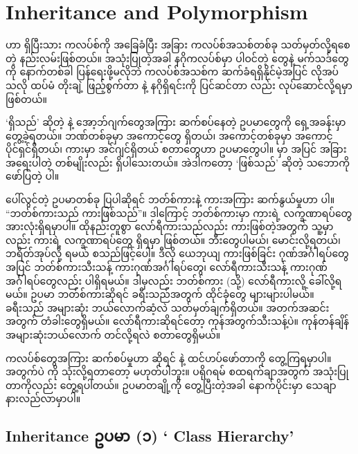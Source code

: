 \chapter{Inheritance and Polymorphism}

 ဟာ ရှိပြီးသား ကလပ်စ်ကို အခြေခံပြီး အခြား ကလပ်စ်အသစ်တစ်ခု သတ်မှတ်လို့ရစေတဲ့ နည်းလမ်းဖြစ်တယ်။  အသုံးပြုတဲ့အခါ နဂိုကလပ်စ်မှာ ပါဝင်တဲ့  တွေနဲ့ မက်သဒ်တွေကို နောက်တစ်ခါ ပြန်ရေးဖို့မလိုဘဲ ကလပ်စ်အသစ်က ဆက်ခံရရှိနိုင်မဲ့အပြင် လိုအပ်သလို ထပ်မံ တိုးချဲ့ ဖြည့်စွက်တာ  နဲ့ နဂိုရှိရင်းကို ပြင်ဆင်တာ  လည်း  လုပ်ဆောင်လို့ရမှာဖြစ်တယ်။

 ‘ရှိသည်’ ဆိုတဲ့  နဲ့ အော့ဘ်ဂျက်တွေအကြား ဆက်စပ်နေတဲ့ ဥပမာတွေကို ရှေ့အခန်းမှာ တွေ့ခဲ့ရတယ်။ ဘဏ်တစ်ခုမှာ အကောင့်တွေ ရှိတယ်၊ အကောင့်တစ်ခုမှာ အကောင့်ပိုင်ရှင်ရှိတယ်၊ ကားမှာ အင်ဂျင်ရှိတယ် စတာတွေဟာ  ဥပမာတွေပါ။  မှာ  အပြင် အခြားအရေးပါတဲ့  တစ်မျိုးလည်း ရှိပါသေးတယ်။ အဲဒါကတော့  ‘ဖြစ်သည်’ ဆိုတဲ့ သဘောကိုဖော်ပြတဲ့   ပါ။ 

ပေါ်လွင်တဲ့ ဥပမာတစ်ခု ပြပါဆိုရင် ဘတ်စ်ကားနဲ့ ကားအကြား ဆက်နွယ်မှုဟာ  ပါ။ “ဘတ်စ်\allowbreak ကားသည် ကားဖြစ်သည်”။ ဒါကြောင့် ဘတ်စ်ကားမှာ ကားရဲ့ လက္ခဏာရပ်တွေ အားလုံးရှိရမှာပါ။ ထိုနည်းတူစွာ လော်ရီကားသည်လည်း  ကားဖြစ်တဲ့အတွက် သူ့မှာလည်း ကားရဲ့ လက္ခဏာရပ်တွေ ရှိရမှာ ဖြစ်တယ်။ ဘီးတွေပါမယ်၊ မောင်းလို့ရတယ်၊ ဘရိတ်အုပ်လို့ ရမယ် စသည်ဖြင့်ပေါ့။ ဒီလို ယေဘုယျ ကားဖြစ်ခြင်း ဂုဏ်အင်္ဂါရပ်တွေအပြင် ဘတ်စ်ကားသီးသန့် ကားဂုဏ်အင်္ဂါရပ်တွေ၊ လော်ရီကားသီးသန့် ကားဂုဏ်အင်္ဂါရပ်တွေလည်း ပါရှိရမယ်။ ဒါမှလည်း ဘတ်စ်ကား (သို့) လော်ရီကားလို့ ခေါ်လို့ရမယ်။ ဥပမာ ဘတ်စ်ကားဆိုရင် ခရီးသည်အတွက် ထိုင်ခုံတွေ များများပါမယ်။  ခရီးသည် အများဆုံး ဘယ်လောက်ဆံ့လဲ သတ်မှတ်ချက်ရှိတယ်။ အတက်အဆင်းအတွက် တံခါးတွေရှိမယ်။ လော်ရီကားဆိုရင်တော့ ကုန်အတွက်သီးသန့်ပဲ။ ကုန်တန်ချိန် အများဆုံးဘယ်လောက် တင်လို့ရလဲ စတာတွေရှိမယ်။ 

ကလပ်စ်တွေအကြား ဆက်စပ်မှုဟာ  ဆိုရင်   နဲ့  ထင်ဟပ်ဖော်တာကို တွေ့ကြရမှာပါ။   အတွက်ပဲ  ကို သုံးလို့ရတာတော့ မဟုတ်ပါဘူး။ ပရိုဂရမ် စထရက်ချာအတွက် အသုံးပြုတာကိုလည်း တွေ့ရပါတယ်။  ဥပမာတချို့ကို တွေ့ပြီးတဲ့အခါ နောက်ပိုင်းမှာ သေချာ နားလည်လာမှာပါ။ 

\section{Inheritance ဥပမာ (၁) ‘ Class Hierarchy’}


